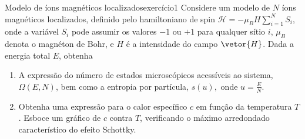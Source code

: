 \begin{exercício}{Modelo de íons magnéticos localizados}{exercício1}
    Considere um modelo de \(N\) íons magnéticos localizados, definido pelo hamiltoniano de spin \(\mathcal{H} = -\mu_BH \sum_{i = 1}^N S_i\), onde a variável \(S_i\) pode assumir os valores \(-1\) ou \(+1\) para qualquer sítio \(i\), \(\mu_B\) denota o magnéton de Bohr, e \(H\) é a intensidade do campo \(\vetor{H}\). Dada a energia total \(E\), obtenha
    \begin{enumerate}[label=(\alph*)]
        \item A expressão do número de estados microscópicos acessíveis ao sistema, \(\Omega(E, N)\), bem como a entropia por partícula, \(s(u),\) onde \(u = \frac{E}{N}\).
        \item Obtenha uma expressão para o calor específico \(c\) em função da temperatura \(T\). Esboce um gráfico de \(c\) contra \(T\), verificando o máximo arredondado característico do efeito Schottky.
    \end{enumerate}
\end{exercício}

